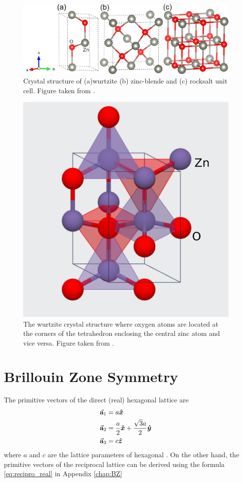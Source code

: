 \begin{figure}[tbh!] 
	\centering
	\includegraphics[width=0.7\linewidth]{"images/rrl/ZnO_unit"}
	\caption[Crystal structure of (a) wurtzite (b) zinc-blende and (c) rocksalt  unit cell]{Crystal structure of (a)wurtzite (b) zinc-blende and (c) rocksalt  unit cell. Figure taken from \citep{Ma2013}.}
	\label{fig:ZnO_unit}
\end{figure}

\begin{figure}[tbh!] 
	\centering
	\includegraphics[width=0.3\linewidth]{"images/rrl/tetrahedral"}
	\caption[The wurtzite crystal structure where oxygen atoms are located at the corners of the  tetrahedron enclosing the central zinc atom and vice versa ]{The wurtzite crystal structure where oxygen atoms are located at the corners of the  tetrahedron enclosing the central zinc atom and vice versa. Figure taken from \citep{Jain2013}.}
	\label{fig:tetras}
\end{figure}

\section{Brillouin Zone Symmetry}
	The primitive vectors of the direct (real) hexagonal lattice are 
\begin{align}
	\va{a}_1 &= a \vu*{x}	\\
	\va{a}_2 &= \frac{a}{2} \vu*{x} + \frac{\sqrt{3}a}{2} \vu*{y} \\
	\va{a}_3 &= c \vu*{z}
\end{align}
where $a$ and $c$ are the lattice parameters of hexagonal . On the other hand, the primitive vectors of the reciprocal lattice can be derived using the formula \eqref{eq:recipro_real} in Appendix \ref{chap:BZ} 

